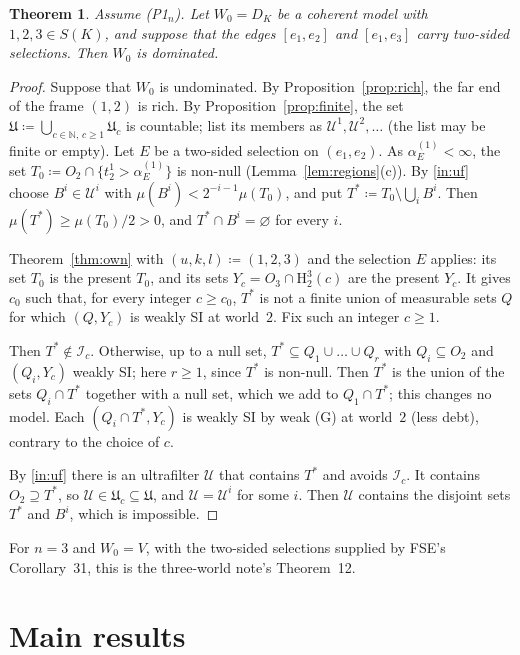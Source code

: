 \documentclass[11pt]{article}
\newtheorem{theorem}{Theorem}
\theoremstyle{definition}\newtheorem{definition}[theorem]{Definition}
\theoremstyle{remark}\newtheorem{remark}[theorem]{Remark}
\newcommand{\Iid}{\mathcal I}
\newcommand{\Uf}{\mathcal U}
\newcommand{\UU}{\mathfrak U}
\newcommand{\Hi}[3]{\mathrm H^{#1}_{#2}(#3)}
\begin{document}
\begin{theorem}\label{thm:count}
Assume (P1$_n$). Let $W_0=D_K$ be a coherent model with $1,2,3\in S(K)$,
and suppose that the edges $[e_1,e_2]$ and $[e_1,e_3]$ carry two-sided
selections. Then $W_0$ is dominated.
\end{theorem}
\begin{proof}
Suppose that $W_0$ is undominated. By Proposition~\ref{prop:rich}, the far
end of the frame $(1,2)$ is rich. By Proposition~\ref{prop:finite}, the set
$\UU\coloneqq\bigcup_{c\in\mathbb N,\,c\ge1}\UU_c$ is countable; list its
members as $\Uf^1,\Uf^2,\dots$ (the list may be finite or empty). Let $E$
be a two-sided selection on $(e_1,e_2)$. As $\alpha^{(1)}_E<\infty$, the
set $T_0\coloneqq O_2\cap\{t^1_2>\alpha^{(1)}_E\}$ is non-null
(Lemma~\ref{lem:regions}(c)). By
\ref{in:uf} choose $B^i\in\Uf^i$ with $\mu(B^i)<2^{-i-1}\mu(T_0)$, and put
$T^*\coloneqq T_0\setminus\bigcup_iB^i$. Then $\mu(T^*)\ge\mu(T_0)/2>0$, and
$T^*\cap B^i=\varnothing$ for every $i$.

Theorem~\ref{thm:own} with $(u,k,l)\coloneqq(1,2,3)$ and the selection $E$
applies: its set $T_0$ is the present $T_0$, and its sets $Y_c=O_3\cap\Hi
32c$ are the present $Y_c$. It gives $c_0$ such that, for every integer
$c\ge c_0$, $T^*$ is not a finite union of measurable sets $Q$ for which
$(Q,Y_c)$ is weakly SI at world~$2$. Fix such an integer $c\ge1$.

Then $T^*\notin\Iid_c$. Otherwise, up to a null set,
$T^*\subseteq Q_1\cup\dots\cup Q_r$ with $Q_i\subseteq O_2$ and $(Q_i,Y_c)$
weakly SI; here $r\ge1$, since $T^*$ is non-null. Then $T^*$ is the union
of the sets $Q_i\cap T^*$ together with a null set, which we add to
$Q_1\cap T^*$; this changes no model. Each $(Q_i\cap T^*,Y_c)$ is weakly SI
by weak (G) at world~$2$ (less debt), contrary to the choice of $c$.

By \ref{in:uf} there is an ultrafilter $\Uf$ that contains $T^*$ and avoids
$\Iid_c$. It contains $O_2\supseteq T^*$, so $\Uf\in\UU_c\subseteq\UU$, and
$\Uf=\Uf^i$ for some $i$. Then $\Uf$ contains the disjoint sets $T^*$ and
$B^i$, which is impossible.
\end{proof}

For $n=3$ and $W_0=V$, with the two-sided selections supplied by FSE's
Corollary~31, this is the three-world note's Theorem~12.

\section{Main results}\label{sec:main}
\end{document}
